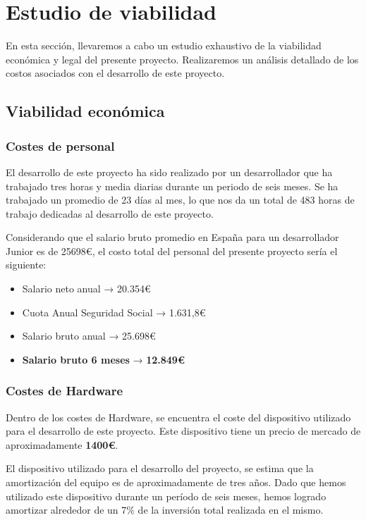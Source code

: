 \section{Estudio de viabilidad}

En esta sección, llevaremos a cabo un estudio exhaustivo de la viabilidad económica y legal del presente proyecto. Realizaremos un análisis detallado de los costos asociados con el desarrollo de este proyecto.

\subsection{Viabilidad económica}

\subsubsection{Costes de personal}

 El desarrollo de este proyecto ha sido realizado por un desarrollador que ha trabajado tres horas y media diarias durante un periodo de seis meses. Se ha trabajado un promedio de 23 días al mes, lo que  nos da un total de 483 horas de trabajo dedicadas al desarrollo de este proyecto. 

Considerando que el salario bruto promedio en España para un desarrollador Junior es de 25698€, el costo total del personal del presente proyecto sería el siguiente:

\begin{itemize}
    \item Salario neto anual              →  20.354€
    \item Cuota Anual Seguridad Social    →  1.631,8€
    \item Salario bruto anual             →  25.698€
    \item \textbf{Salario bruto 6 meses}  → \textbf{12.849€}
\end{itemize}

\subsubsection{Costes de Hardware }
Dentro de los costes de Hardware, se encuentra el coste del dispositivo utilizado para el desarrollo de este proyecto. Este dispositivo tiene un precio de mercado de aproximadamente \textbf{1400€}.

El dispositivo utilizado para el desarrollo del proyecto, se estima que la amortización del equipo es de aproximadamente de tres años.
Dado que hemos utilizado este dispositivo durante un período de seis meses, hemos logrado amortizar alrededor de un 7\% de la inversión total realizada en el mismo.

